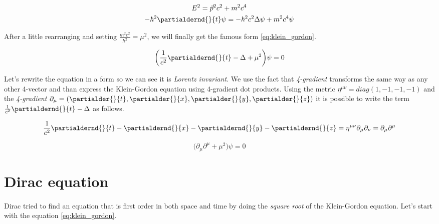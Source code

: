 \begin{equation*}
    \begin{gathered}
        E^{2} = \vec{p}^{2} c^{2} + m^{2} c^{4} \\
        - \hbar^{2} \partialdernd{}{t} \psi = - \hbar^{2} c^{2} \Delta \psi + m^{2} c^{4} \psi
    \end{gathered}
\end{equation*}

After a little rearranging and setting $\frac{m^{2} c^{2}}{\hbar^{2}} = \mu^{2}$, we will finally get the famous form \ref{eq:klein_gordon}.

\begin{equation}
    \label{eq:klein_gordon}
    \bigg(\frac{1}{c^{2}} \partialdernd{}{t} - \Delta + \mu^{2} \bigg) \psi = 0
\end{equation}

Let's rewrite the equation in a form so we can see it is \textit{Lorentz invariant}. We use the fact that \textit{4-gradient}
transforms the same way as any other 4-vector and than express the Klein-Gordon equation using 4-gradient dot products.
Using the metric $\eta^{\mu \nu} = diag(1, -1, -1, -1)$ and the \textit{4-gradient} $\partial_{\mu} = (\partialder{}{t}, \partialder{}{x}, \partialder{}{y}, \partialder{}{z})$ 
it is possible to write the term $\frac{1}{c^{2}} \partialdernd{}{t} - \Delta$ as follows.

\begin{equation*}
     \frac{1}{c^{2}} \partialdernd{}{t} - \partialdernd{}{x} - \partialdernd{}{y} - \partialdernd{}{z} = \eta^{\mu \nu} \partial_{\mu} \partial_{\nu} = \partial_{\mu} \partial^{\mu}
\end{equation*}

\begin{equation}
    \bigg(\partial_{\mu} \partial^{\mu} + \mu^{2} \bigg) \psi = 0
\end{equation}

\section{Dirac equation}

\paragraph{} Dirac tried to find an equation that is first order in both space and time by doing the \textit{square root} 
of the Klein-Gordon equation. Let's start with the equation \ref{eq:klein_gordon}.

